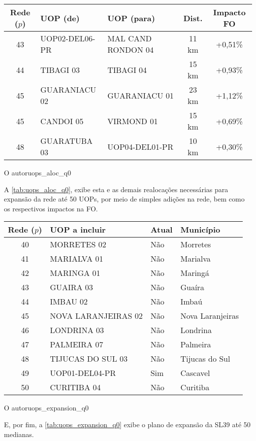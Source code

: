 {\begin{tabular}{c|l|l|c|c}\hline
 Rede ($p$) & UOP (de) & UOP (para) & Dist. & Impacto FO \\ \hline\hline
 43 & UOP02-DEL06-PR & MAL CAND RONDON 04 & 11 km & +0,51\% \\
 44 & TIBAGI 03 & TIBAGI 04 & 15 km & +0,93\% \\
 45 & GUARANIACU 02 & GUARANIACU 01 & 23 km & +1,12\% \\
 45 & CANDOI 05 & VIRMOND 01 & 15 km & +0,69\% \\
 48 & GUARATUBA 03 & UOP04-DEL01-PR & 10 km & +0,30\% \\
 \hline
\end{tabular}}
{O autor}{uops_aloc_q0}{}{}

A \autoref{tab:uops_aloc_q0}, exibe esta e as demais realocações necessárias para expansão da rede até 50 UOPs, por meio de simples adições na rede, bem como os respectivos impactos na FO. 

{\begin{tabular}{c|l|l|l}\hline
 Rede ($p$) & UOP a incluir & Atual & Município \\ \hline\hline
 40 &         MORRETES 02 &   Não &         Morretes \\
  41 &         MARIALVA 01 &   Não &         Marialva \\
  42 &          MARINGA 01 &   Não &          Maringá \\
  43 &           GUAIRA 03 &   Não &           Guaíra \\
  44 &            IMBAU 02 &   Não &            Imbaú \\
  45 & NOVA LARANJEIRAS 02 &   Não & Nova Laranjeiras \\
  46 &         LONDRINA 03 &   Não &         Londrina \\
  47 &         PALMEIRA 07 &   Não &         Palmeira \\
  48 &   TIJUCAS DO SUL 03 &   Não &   Tijucas do Sul \\
  49 &      UOP01-DEL04-PR &   Sim &         Cascavel \\
  50 &         CURITIBA 04 &   Não &         Curitiba \\
 \hline
\end{tabular}}
{O autor}{uops_expansion_q0}{}{}

E, por fim, a \autoref{tab:uops_expansion_q0} exibe o plano de expansão da SL39 até 50 medianas.

